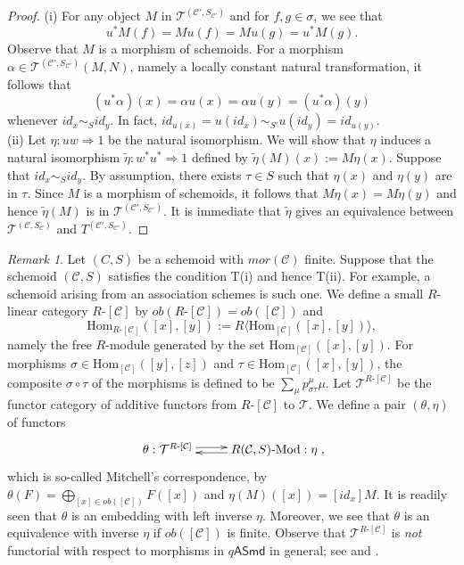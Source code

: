 \documentclass{amsart}
\theoremstyle{definition}
\theoremstyle{remark}
\newtheorem{rem}[thm]{Remark}
\newcommand{\C}{{\mathcal C}}
\newcommand{\T}{{\mathcal T}}
\begin{document}
\begin{proof} 
(i) For any object $M$ in  $\T^{(\C', S_{\C'})}$ and for $f, g \in \sigma$, we see that 
$$
u^*M(f) = Mu(f) = Mu(g) = u^*M(g).
$$
Observe that $M$ is a morphism of schemoids. For a morphism $\alpha \in  \T^{(\C', S_{\C'})}(M, N)$, namely 
a locally constant natural transformation, it follows that 
$$
(u^*\alpha)(x) = \alpha u(x) = \alpha u(y) =(u^*\alpha)(y) 
$$
whenever $id_x\sim_S id_y$. In fact, $id_{u(x)} = u(id_x) \sim_{S'} u(id_y) = id_{u(y)}$.  \\
(ii) Let $\eta : uw \Rightarrow 1$ be the natural isomorphism. We will show that $\eta$ 
induces a natural isomorphism $\widetilde{\eta} : w^*u^*  \Rightarrow 1$ defined by 
$\widetilde{\eta}(M)(x) :=M\eta(x)$. 
Suppose that $id_x \sim_S id_y$. By assumption, there exists $\tau \in S$ such that 
$\eta(x)$ and $\eta(y)$ are in $\tau$. 
Since $M$ is a morphism of schemoids, it follows that 
$M\eta(x) = M\eta(y)$ and hence  $\widetilde{\eta}(M)$ is in $\T^{(\C', S_{\C'})}$. It is immediate that 
$\widetilde{\eta}$ gives an equivalence between $\T^{(\C, S_{\C})}$ and $T^{(\C', S_{\C'})}$.
\end{proof}


\begin{rem}\label{Mitchell's_correspondence}
Let $(C, S)$ be a schemoid with $mor(\C)$ finite. Suppose that  the schemoid 
$(\C, S)$ satisfies the condition T(i) and hence T(ii). For example, a schemoid arising from 
an association schemes is such one. We define a small $R$-linear category $R\text{-}[\C]$ by 
$ob(R\text{-}[\C]) = ob([\C])$ and 
$$
\text{Hom}_{R\text{-}[\C]}([x], [y]) := R\langle \text{Hom}_{[\C]}([x], [y]) \rangle, 
$$
namely the free $R$-module generated by the set $\text{Hom}_{[\C]}([x], [y])$. For morphisms 
$\sigma \in \text{Hom}_{[\C]}([y], [z])$ and $\tau \in \text{Hom}_{[\C]}([x], [y])$, the composite $\sigma \circ \tau$ of the morphisms
is defined  to be $\sum_{\mu}p^{\mu}_{\sigma \tau}\mu$. 
Let $\T^{R\text{-}[\C]}$ be the functor category of additive functors from $R\text{-}[\C]$ to $\T$. We define a pair $(\theta, \eta)$ of functors 
$$\xymatrix@C25pt@R20pt{
\theta  : \T^{R\text{-}[\C]}  \ar@<0.5ex>[r]&
R(\C, S)\text{-Mod}  : \eta  \ar@<0.5ex>[l]}, $$ 
which is so-called Mitchell's correspondence, by 
$\theta(F) = \bigoplus_{[x] \in ob([\C])}F([x])$ and $\eta (M)([x]) = [id_x]M$.  It is readily seen that 
$\theta$ is an embedding with left inverse $\eta$. Moreover, we see that $\theta$ is an equivalence with inverse $\eta$ if 
$ob([\C])$ is finite. Observe that $\T^{R\text{-}[\C]}$ is {\it not} functorial with respect to morphisms in $q\mathsf{ASmd}$ in general; 
see \cite[Section 6]{K-M} and  \cite[Section 6]{F_1}.
\end{rem}
\end{document}
